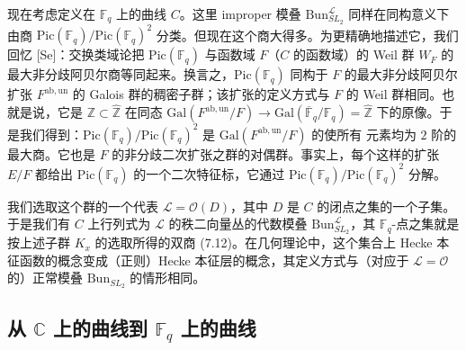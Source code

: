 \documentclass[11pt,a4paper]{article}
\newcommand{\Bun}{\mathrm{Bun}}
\begin{document}
现在考虑定义在 $\mathbb{F}_q$ 上的曲线 $C$。这里 improper 模叠 $\Bun^{\mathcal{L}}_{SL_2}$ 同样在同构意义下由商 $\mathrm{Pic}(\mathbb{F}_q)/\mathrm{Pic}(\mathbb{F}_q)^2$ 分类。但现在这个商大得多。为更精确地描述它，我们回忆 [Se]：交换类域论把 $\mathrm{Pic}(\mathbb{F}_q)$ 与函数域 $F$（$C$ 的函数域）的 Weil 群 $W_F$ 的最大非分歧阿贝尔商等同起来。换言之，$\mathrm{Pic}(\mathbb{F}_q)$ 同构于 $F$ 的最大非分歧阿贝尔扩张 $F^{\mathrm{ab},\mathrm{un}}$ 的 Galois 群的稠密子群；该扩张的定义方式与 $F$ 的 Weil 群相同。也就是说，它是 $\mathbb{Z}\subset \hat{\mathbb{Z}}$ 在同态 $\mathrm{Gal}(F^{\mathrm{ab},\mathrm{un}}/F)\to \mathrm{Gal}(\overline{\mathbb{F}}_q/\mathbb{F}_q) = \hat{\mathbb{Z}}$ 下的原像。于是我们得到：$\mathrm{Pic}(\mathbb{F}_q)/\mathrm{Pic}(\mathbb{F}_q)^2$ 是 $\mathrm{Gal}(F^{\mathrm{ab},\mathrm{un}}/F)$ 的使所有
元素均为 $2$ 阶的最大商。它也是 $F$ 的非分歧二次扩张之群的对偶群。事实上，每个这样的扩张 $E/F$ 都给出 $\mathrm{Pic}(\mathbb{F}_q)$ 的一个二次特征标，它通过 $\mathrm{Pic}(\mathbb{F}_q)/\mathrm{Pic}(\mathbb{F}_q)^2$ 分解。


我们选取这个群的一个代表 $\mathcal{L} = \mathcal{O}(D)$，其中 $D$ 是 $C$ 的闭点之集的一个子集。于是我们有 $C$ 上行列式为 $\mathcal{L}$ 的秩二向量丛的代数模叠 $\Bun^{\mathcal{L}}_{SL_2}$，其 $\mathbb{F}_q$-点之集就是按上述子群 $K_x$ 的选取所得的双商 (7.12)。在几何理论中，这个集合上 Hecke 本征函数的概念变成（正则）Hecke 本征层的概念，其定义方式与（对应于 $\mathcal{L} = \mathcal{O}$ 的）正常模叠 $\Bun_{SL_2}$ 的情形相同。

\subsection{从 \texorpdfstring{$\mathbb{C}$}{C} 上的曲线到 \texorpdfstring{$\mathbb{F}_q$}{Fq} 上的曲线}
\end{document}
